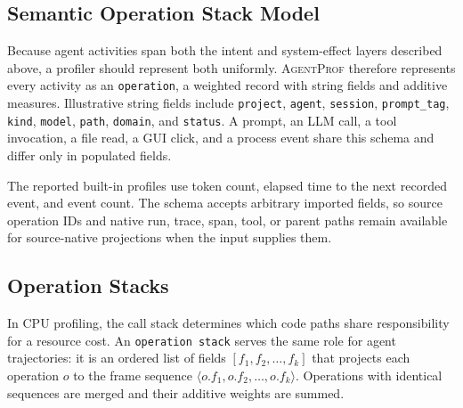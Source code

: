\documentclass[letterpaper]{article}
\newcommand{\sys}{\textsc{AgentProf}\xspace}
\newcommand{\operation}{\texttt{operation}\xspace}
\newcommand{\opstack}{\texttt{operation stack}\xspace}
\begin{document}
\subsection{Semantic Operation Stack Model}
\label{sec:ops}

Because agent activities span both the intent and system-effect
layers described above, a profiler should
represent both uniformly.
\sys therefore represents every activity as an \operation, a weighted
record with string fields and additive measures.
Illustrative string fields include \texttt{project},
\texttt{agent}, \texttt{session}, \texttt{prompt\_tag},
\texttt{kind}, \texttt{model}, \texttt{path}, \texttt{domain}, and
\texttt{status}. A prompt, an LLM call, a tool invocation, a file read, a GUI
click, and a process event share this schema and differ only in populated
fields.

The reported built-in profiles use token count, elapsed time to the next recorded
event, and event count. The schema accepts arbitrary imported fields, so source
operation IDs and native run, trace, span, tool, or parent paths remain
available for source-native projections when the input supplies them.

\subsection{Operation Stacks}
\label{sec:stacks}
In CPU profiling, the call stack determines which code paths
share responsibility for a resource cost.
An \opstack serves the same role for agent trajectories: it is an ordered list
of fields $[f_1,f_2,\ldots,f_k]$ that projects each operation $o$ to the frame
sequence $\langle o.f_1,o.f_2,\ldots,o.f_k\rangle$. Operations with identical
sequences are merged and their additive weights are summed.
\end{document}
